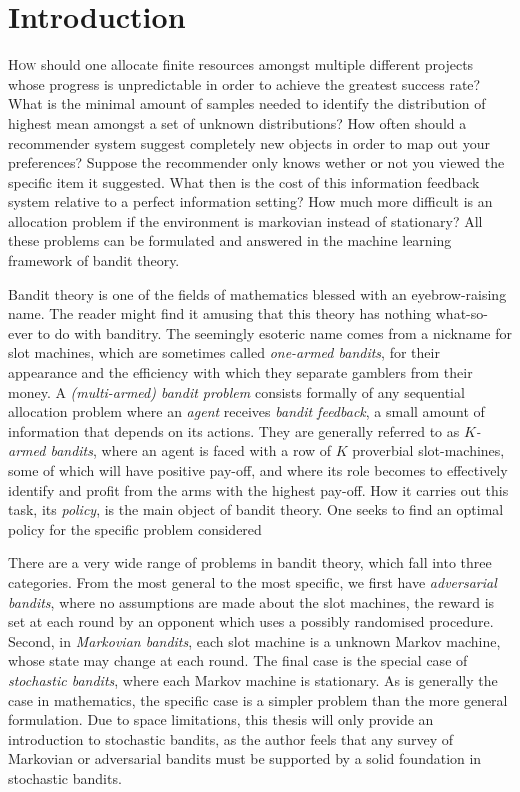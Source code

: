 \chapter*{Introduction}

\lettrine[lines=4]{\textcolor{dropcap}{H}}{ow} should one allocate finite resources amongst multiple different projects whose progress is unpredictable in order to achieve the greatest success rate? What is the minimal amount of samples needed to identify the distribution of highest mean amongst a set of unknown distributions? How often should a recommender system suggest completely new objects in order to map out your preferences? Suppose the recommender only knows wether or not you viewed the specific item it suggested. What then is the cost of this information feedback system relative to a perfect information setting? How much more difficult is an allocation problem if the environment is markovian instead of stationary? All these problems can be formulated and answered in the machine learning framework of bandit theory. 

\par Bandit theory is one of the fields of mathematics blessed with an eyebrow-raising name. The reader might find it amusing that this theory has nothing what-so-ever to do with banditry.  The seemingly esoteric name comes from a nickname for slot machines, which are sometimes called {\em one-armed bandits}, for their appearance and the efficiency with which they separate gamblers from their money. A {\em (multi-armed) bandit problem} consists formally of any sequential allocation problem where an {\em agent} receives {\em bandit feedback}, a small amount of information that depends on its actions. They are generally referred to as {\em $K$-armed bandits}, where an agent is faced with a row of $K$ proverbial slot-machines, some of which will have positive pay-off, and where its role becomes to effectively identify and profit from the arms with the highest pay-off. How it carries out this task, its {\em policy}, is the main object of bandit theory. One seeks to find an optimal policy for the specific problem considered

\par There are a very wide range of problems in bandit theory, which fall into three categories. From the most general to the most specific, we first have {\em adversarial bandits}, where no assumptions are made about the slot machines, the reward is set at each round by an opponent which uses a possibly randomised procedure. Second, in {\em Markovian bandits}, each slot machine is a unknown Markov machine, whose state may change at each round. The final case is the special case of {\em stochastic bandits}, where each Markov machine is stationary. As is generally the case in mathematics, the specific case is a simpler problem than the more general formulation. Due to space limitations, this thesis will only provide an introduction to stochastic bandits, as the author feels that any survey of Markovian or adversarial bandits must be supported by a solid foundation in stochastic bandits. 


